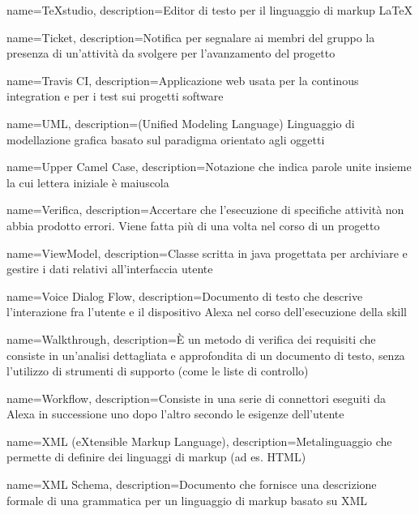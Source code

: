 {
	name={TeXstudio},
	description={Editor di testo per il linguaggio di markup \LaTeX}
}

{
	name={Ticket},
	description={Notifica per segnalare ai membri del gruppo la presenza di un’attività da svolgere per l’avanzamento del progetto}
}

{
	name={Travis CI},
	description={Applicazione web usata per la continous integration e per i test sui progetti software}
}

{
	name={UML},
	description={(Unified Modeling Language) Linguaggio di modellazione grafica basato sul paradigma orientato agli oggetti}
}

{
	name={Upper Camel Case},
	description={Notazione che indica parole unite insieme la cui lettera iniziale è maiuscola}
}

{
	name={Verifica},
	description={Accertare che l’esecuzione di specifiche attività non abbia prodotto errori. Viene fatta più di una volta nel corso di un progetto}
}

{
	name={ViewModel},
	description={Classe scritta in java progettata per archiviare e gestire i dati relativi all'interfaccia utente}
}

{
	name={Voice Dialog Flow},
	description={Documento di testo che descrive l'interazione fra l'utente e il dispositivo Alexa nel corso dell'esecuzione della skill}
}

{
	name={Walkthrough},
	description={È un metodo di verifica dei requisiti che consiste in un'analisi dettagliata e approfondita di un documento di testo, senza l'utilizzo di strumenti di supporto (come le liste di controllo)}
}

{
	name={Workflow},
	description={Consiste in una serie di connettori eseguiti da Alexa in successione uno dopo l'altro secondo le esigenze dell'utente}
}

{
	name={XML (eXtensible Markup Language)},
	description={Metalinguaggio che permette di definire dei linguaggi di markup (ad es. HTML)}
}

{
	name={XML Schema},
	description={Documento che fornisce una descrizione formale di una grammatica per un linguaggio di markup basato su XML}
}